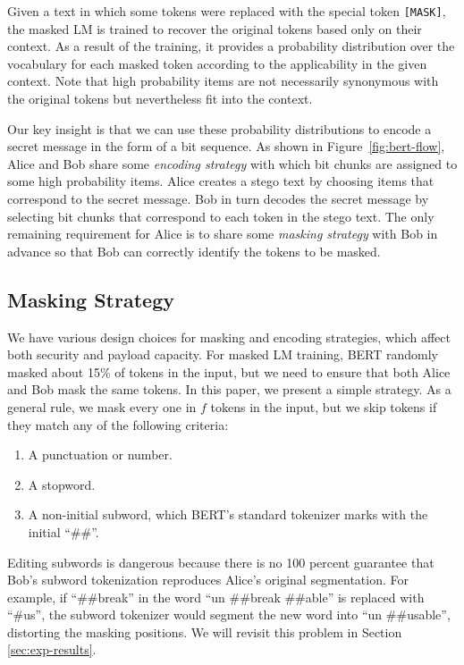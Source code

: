 \documentclass[11pt]{article}
\begin{document}
Given a text in which some tokens were replaced with the special token \texttt{[MASK]}, the masked LM is trained to recover the original tokens based only on their context.
As a result of the training, it provides a probability distribution over the vocabulary for each masked token according to the applicability in the given context.
Note that high probability items are not necessarily synonymous with the original tokens but nevertheless fit into the context.

Our key insight is that we can use these probability distributions to encode a secret message in the form of a bit sequence.
As shown in Figure~\ref{fig:bert-flow}, Alice and Bob share some \textit{encoding strategy} with which bit chunks are assigned to some high probability items.
Alice creates a stego text by choosing items that correspond to the secret message.
Bob in turn decodes the secret message by selecting bit chunks that correspond to each token in the stego text.
The only remaining requirement for Alice is to share some \textit{masking strategy} with Bob in advance so that Bob can correctly identify the tokens to be masked.


\subsection{Masking Strategy} \label{sec:proposed-masking}

We have various design choices for masking and encoding strategies, which affect both security and payload capacity.
For masked LM training, BERT randomly masked about 15\% of tokens in the input, but we need to ensure that both Alice and Bob mask the same tokens.
In this paper, we present a simple strategy.
As a general rule, we mask every one in $f$ tokens in the input, but we skip tokens if they match any of the following criteria:
\begin{enumerate}
    \item A punctuation or number.
    \item A stopword.
    \item A non-initial subword, which BERT's standard tokenizer marks with the initial ``\#\#''.
\end{enumerate}
Editing subwords is dangerous because there is no 100 percent guarantee that Bob's subword tokenization reproduces Alice's original segmentation.
For example, if ``\#\#break'' in the word ``un \#\#break \#\#able'' is replaced with ``\#us'', the subword tokenizer would segment the new word into ``un \#\#usable'', distorting the masking positions.
We will revisit this problem in Section~ \ref{sec:exp-results}.
\end{document}
